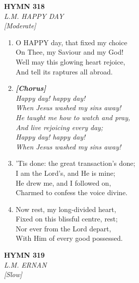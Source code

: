 \documentclass[11pt,a4paper]{article}
\begin{document}
\newpage
\begin{center}
    {\Large \textbf{HYMN 318}}
    \\
    \textit{L.M. HAPPY DAY}
    \\
    \textit{\small [Moderate]}
\end{center}
\vspace{1em}

\begin{enumerate}
    \item O HAPPY day, that fixed my choice \\
        On Thee, my Saviour and my God! \\
        Well may this glowing heart rejoice, \\
        And tell its raptures all abroad.

    \item[] \vspace{0.4em}
    \textbf{\textit{[Chorus]}} \\
    \textit{Happy day! happy day!} \\
    \textit{When Jesus washed my sins away!} \\
    \textit{He taught me how to watch and pray,} \\
    \textit{And live rejoicing every day;} \\
    \textit{Happy day! happy day!} \\
    \textit{When Jesus washed my sins away!}
    \vspace{0.4em}

    \item 'Tis done: the great transaction's done; \\
        I am the Lord's, and He is mine; \\
        He drew me, and I followed on, \\
        Charmed to confess the voice divine.

    \item Now rest, my long-divided heart, \\
        Fixed on this blissful centre, rest; \\
        Nor ever from the Lord depart, \\
        With Him of every good possessed.

\end{enumerate}

\newpage
\begin{center}
    {\Large \textbf{HYMN 319}}
    \\
    \textit{L.M. ERNAN}
    \\
    \textit{\small [Slow]}
\end{center}
\vspace{1em}
\end{document}
